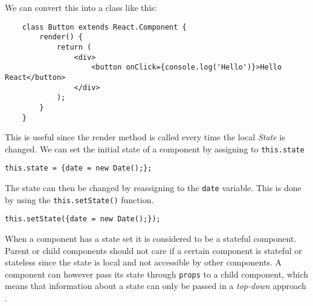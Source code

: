 We can convert this into a class like this:
\begin{lstlisting}
    class Button extends React.Component {
        render() {
            return (
                <div>
                    <button onClick={console.log('Hello')}>Hello React</button>
                </div>
            );
        }
    }
\end{lstlisting}
This is useful since the render method is called every time the local \textit{State} is changed.
We can set the initial state of a component by assigning to \texttt{this.state}
\begin{center}
    \texttt{this.state = \{date = new Date();\};}
\end{center}
The state can then be changed by reassigning to the \texttt{date} variable.
This is done by using the \texttt{this.setState()} function.
\begin{center}
    \texttt{this.setState(\{date = new Date();\});}
\end{center}
When a component has a state set it is considered to be a stateful component.
Parent or child components should not care if a certain component is stateful or stateless since the state is local and not accessible by other components.
A component can however pass its state through \texttt{props} to a child component, which means that information about a state can only be passed in a \textit{top-down} approach \cite{ReactJS}.
